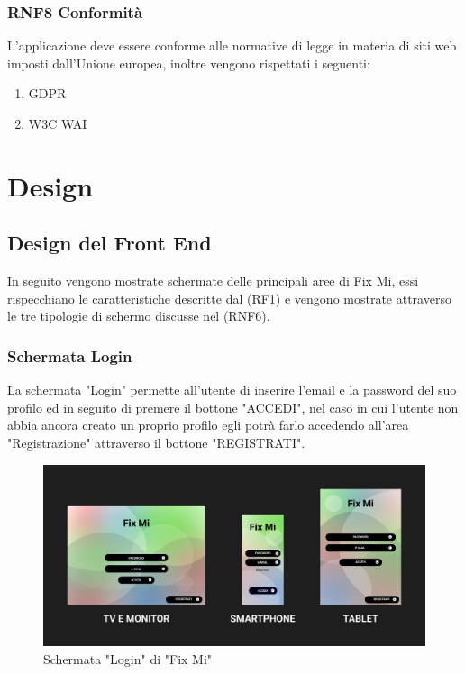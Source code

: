 \documentclass{report}
\begin{document}
\subsection*{RNF8 Conformità}
L'applicazione deve essere conforme alle normative di legge in materia di siti web imposti dall'Unione europea, inoltre vengono rispettati i seguenti:
\begin{enumerate}
	\item GDPR
	\item W3C WAI
\end{enumerate}
\chapter{Design}

\section{Design del Front End}

In seguito vengono mostrate schermate delle principali aree di Fix Mi, essi rispecchiano le caratteristiche descritte dal (RF1) e vengono mostrate attraverso le tre tipologie di schermo discusse nel (RNF6). 

\subsection*{Schermata Login}

La schermata "Login" permette all'utente di inserire l'email e la password del suo profilo ed in seguito di premere il bottone "ACCEDI", nel caso in cui l'utente non abbia ancora creato un proprio profilo egli potrà farlo accedendo all'area "Registrazione" attraverso il bottone "REGISTRATI".

\begin{figure}[h]
	\centering
	\includegraphics[width=1\textwidth]{images/Snapshots/login_snapshot.png}
	\caption{Schermata "Login" di "Fix Mi"}
\end{figure}	
\end{document}

